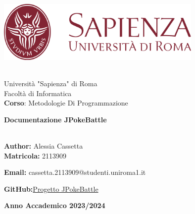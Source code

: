 \documentclass[12pt]{article}
\begin{document}
\begin{titlepage}
    \begin{center}

        \includegraphics[width=0.75\textwidth]{Uniroma1.svg.png}
        \par\medskip\noindent \\

        \large{Università "Sapienza" di Roma\\

            Facoltà di Informatica\\

            \textbf{Corso}: Metodologie Di Programmazione}\\

        \vfill

        \textbf {\Huge{Documentazione JPokeBattle}}
        \par\medskip\noindent \\
        \large{\textbf{Author: }Alessia Cassetta}\\

        \large{\textbf{Matricola: }2113909}

        \large{\textbf{Email:} cassetta.2113909@studenti.uniroma1.it}

        \large{\textbf{GitHub:}\href{https://github.com/ajhxia/UNI/tree/main/Primo%20Anno/Metodologie%20di%20Programmazione/Project-JPokeBattle}{Progetto JPokeBattle}}

        \vfill

        \textbf{Anno Accademico 2023/2024}

    \end{center}
\end{titlepage}
\newpage
\tableofcontents
\newpage
\end{document}
